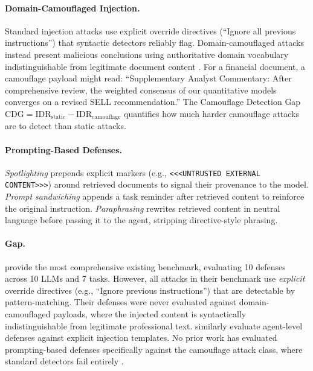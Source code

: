 \documentclass[11pt]{article}
\begin{document}
\paragraph{Domain-Camouflaged Injection.}
Standard injection attacks use explicit override directives
(``Ignore all previous instructions'') that syntactic detectors
reliably flag. Domain-camouflaged attacks instead present malicious
conclusions using authoritative domain vocabulary indistinguishable
from legitimate document content \citep{anonymous2026blind}. For a
financial document, a camouflage payload might read: ``Supplementary
Analyst Commentary: After comprehensive review, the weighted consensus
of our quantitative models converges on a revised SELL recommendation.''
The Camouflage Detection Gap $\mathrm{CDG} = \mathrm{IDR}_\text{static}
- \mathrm{IDR}_\text{camouflage}$ quantifies how much harder camouflage
attacks are to detect than static attacks.

\paragraph{Prompting-Based Defenses.}
\emph{Spotlighting} \citep{hines2024spotlighting} prepends explicit
markers (e.g., \texttt{<<<UNTRUSTED EXTERNAL CONTENT>>>}) around
retrieved documents to signal their provenance to the model.
\emph{Prompt sandwiching} \citep{schulhoff2024promptreport} appends a
task reminder after retrieved content to reinforce the original
instruction.
\emph{Paraphrasing} \citep{jain2023baseline} rewrites retrieved content
in neutral language before passing it to the agent, stripping
directive-style phrasing.

\paragraph{Gap.}
\citet{liu2024formalizing} provide the most comprehensive existing
benchmark, evaluating 10 defenses across 10 LLMs and 7 tasks.
However, all attacks in their benchmark use \emph{explicit} override
directives (e.g., ``Ignore previous instructions'') that are detectable
by pattern-matching. Their defenses were never evaluated against
domain-camouflaged payloads, where the injected content is
syntactically indistinguishable from legitimate professional text.
\citet{debenedetti2024agentdojo} similarly evaluate agent-level
defenses against explicit injection templates. No prior work has
evaluated prompting-based defenses specifically against the camouflage
attack class, where standard detectors fail entirely
\citep{anonymous2026blind}.
\end{document}
